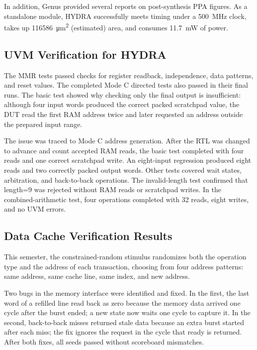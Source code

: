\documentclass[conference]{IEEEtran}
\begin{document}
        In addition, Genus provided several reports on post-synthesis PPA figures. As a standalone module, HYDRA successfully meets timing under a \SI{500}{\mega\hertz} clock, takes up \SI{116586}{\micro\meter\squared} (estimated) area, and consumes \SI{11.7}{\milli\watt} of power.
    \subsection{UVM Verification for HYDRA}
        The MMR tests passed checks for register readback, independence, data patterns, and reset values. The completed Mode C directed tests also passed in their final runs. The basic test showed why checking only the final output is insufficient: although four input words produced the correct packed scratchpad value, the DUT read the first RAM address twice and later requested an address outside the prepared input range.

        The issue was traced to Mode C address generation. After the RTL was changed to advance and count accepted RAM reads, the basic test completed with four reads and one correct scratchpad write. An eight-input regression produced eight reads and two correctly packed output words. Other tests covered wait states, arbitration, and back-to-back operations. The invalid-length test confirmed that length=9 was rejected without RAM reads or scratchpad writes. In the combined-arithmetic test, four operations completed with 32 reads, eight writes, and no UVM errors.
    \subsection{Data Cache Verification Results}
        This semester, the constrained-random stimulus randomizes both the operation type and the address of each transaction, choosing from four address patterns: same address, same cache line, same index, and new address.

        Two bugs in the memory interface were identified and fixed. In the first, the last word of a refilled line read back as zero because the memory data arrived one cycle after the burst ended; a new state now waits one cycle to capture it. In the second, back-to-back misses returned stale data because an extra burst started after each miss; the fix ignores the request in the cycle that ready is returned. After both fixes, all seeds passed without scoreboard mismatches.
    
\end{document}
